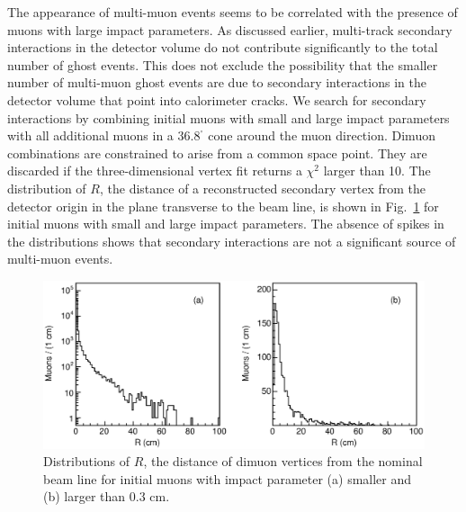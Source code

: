 \documentclass[aps,prd,preprint,floatfix,nofootinbib,superscriptaddress,showpacs,amssymb]{revtex4}
\def\deg{^\circ}
\begin{document}
 The appearance of multi-muon events seems to be correlated with the
 presence of muons with large impact parameters. As discussed earlier,
 multi-track secondary interactions in the detector volume do not contribute
 significantly to the total number of ghost events. This does not exclude
 the possibility that the smaller number of multi-muon ghost events are 
 due to secondary interactions in the detector volume that point into
 calorimeter cracks. We search for secondary interactions by combining
 initial muons with small and large impact parameters with all additional
 muons in a 36.8$^{\deg}$ cone around the muon  direction. Dimuon 
 combinations are constrained to arise from a common space point. They are
 discarded if the three-dimensional vertex fit returns a $\chi^2$ 
 larger than 10. The distribution of $R$, the distance of a
 reconstructed secondary vertex from the detector origin in the plane
 transverse to the beam line, is shown in Fig.~\ref{fig:fig_sint1} for
 initial muons with small and large impact parameters. The absence of 
 spikes in the distributions shows that secondary interactions are not
 a significant source of multi-muon events.
 \begin{figure}[]
 \begin{center}
 \vspace{-0.2in}
 \leavevmode
 \includegraphics*[width=\textwidth]{rv_dimu_comb.eps}
 \caption[]{Distributions of $R$, the distance of dimuon vertices from
            the nominal beam line for initial muons with impact parameter
            (a) smaller and (b) larger than 0.3 cm.}
 \label{fig:fig_sint1}
 \end{center}
 \end{figure}
\end{document}

